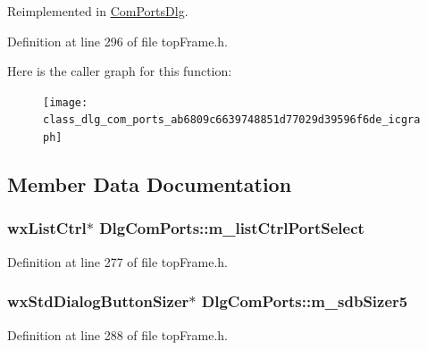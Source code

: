 Reimplemented in \hyperlink{class_com_ports_dlg_ac3f80f2b8484c4c0c4c67b0ccafe8372}{Com\-Ports\-Dlg}.



Definition at line 296 of file top\-Frame.\-h.



Here is the caller graph for this function\-:
\nopagebreak
\begin{figure}[H]
\begin{center}
\leavevmode
\texttt{[image: class\_dlg\_com\_ports\_ab6809c6639748851d77029d39596f6de\_icgraph]}
\end{center}
\end{figure}




\subsection{Member Data Documentation}
\hypertarget{class_dlg_com_ports_a79fa4831dbf5e4aa13f239c23d1ca9a8}{
\subsubsection[{m\-\_\-list\-Ctrl\-Port\-Select}]{\setlength{\rightskip}{0pt plus 5cm}wx\-List\-Ctrl$\ast$ Dlg\-Com\-Ports\-::m\-\_\-list\-Ctrl\-Port\-Select\hspace{0.3cm}{\ttfamily [protected]}}}\label{class_dlg_com_ports_a79fa4831dbf5e4aa13f239c23d1ca9a8}


Definition at line 277 of file top\-Frame.\-h.

\hypertarget{class_dlg_com_ports_ace2a43e0c378c7c1e032d10ba7f082d5}{
\subsubsection[{m\-\_\-sdb\-Sizer5}]{\setlength{\rightskip}{0pt plus 5cm}wx\-Std\-Dialog\-Button\-Sizer$\ast$ Dlg\-Com\-Ports\-::m\-\_\-sdb\-Sizer5\hspace{0.3cm}{\ttfamily [protected]}}}\label{class_dlg_com_ports_ace2a43e0c378c7c1e032d10ba7f082d5}


Definition at line 288 of file top\-Frame.\-h.

